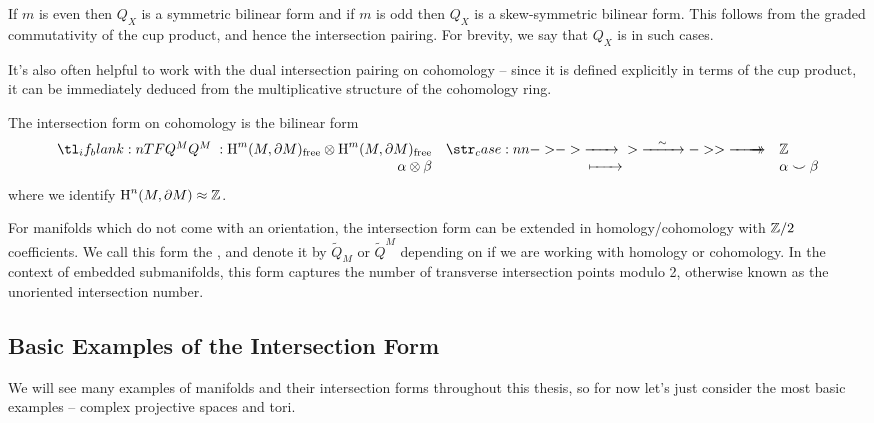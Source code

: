 \begin{remark}
	If $m$ is even then $Q_X$ is a symmetric bilinear form and if $m$ is odd then $Q_X$ is a skew-symmetric bilinear form. This follows from the graded commutativity of the cup product, and hence the intersection pairing. For brevity, we say that $Q_X$ is  in such cases.
\end{remark}

It's also often helpful to work with the dual intersection pairing on cohomology -- since it is defined explicitly in terms of the cup product, it can be immediately deduced from the multiplicative structure of the cohomology ring.
\begin{definition}
	The intersection form on cohomology is the bilinear form
	\begin{equation}
		\lkxfunc{Q^M}{\H^m(M,\partial M)_{\mathrm{free}}\otimes \H^m(M,\partial M)_{\mathrm{free}}}{\Z}{\alpha\otimes \beta}{\alpha\smile \beta}
	\end{equation}
	where we identify $\operatorname{H}^n(M,\partial M)\approx \mathbb{Z}$.
\end{definition}


\begin{remark}
For manifolds which do not come with an orientation, the intersection form can be extended in homology/cohomology with $\mathbb{Z}/2$ coefficients. We call this form the , and denote it by $\widetilde{Q}_M$ or $\widetilde{Q}^M$ depending on if we are working with homology or cohomology. In the context of embedded submanifolds, this form captures the number of transverse intersection points modulo 2, otherwise known as the unoriented intersection number. 
\end{remark}

\subsection{Basic Examples of the Intersection Form}

We will see many examples of manifolds and their intersection forms throughout this thesis, so for now let's just consider the most basic examples -- complex projective spaces and tori.

